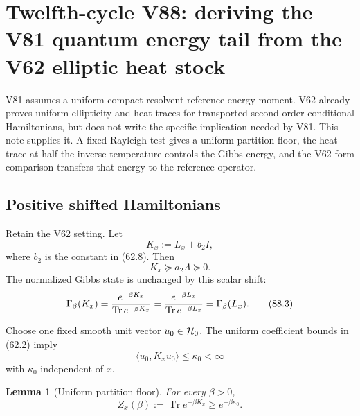 \documentclass[11pt]{article}
\newtheorem{lemma}[theorem]{Lemma}
\theoremstyle{remark}
\begin{document}

\section{Twelfth-cycle V88: deriving the V81 quantum energy tail from
the V62 elliptic heat stock}
\label{sec:v12v88}

V81 assumes a uniform compact-resolvent reference-energy moment.
V62 already proves uniform ellipticity and heat traces for transported
second-order conditional Hamiltonians, but does not write the
specific implication needed by V81.  This note supplies it.  A fixed
Rayleigh test gives a uniform partition floor, the heat trace at half
the inverse temperature controls the Gibbs energy, and the V62 form
comparison transfers that energy to the reference operator.

\subsection{Positive shifted Hamiltonians}

Retain the V62 setting.  Let
\[
                         K_x:=L_x+b_2I,                      \tag{88.1}
\]
where \(b_2\) is the constant in (62.8).  Then
\begin{equation}
                         K_x\succeq a_2\Lambda\succeq0.      \tag{88.2}
\end{equation}
The normalized Gibbs state is unchanged by this scalar shift:
\begin{equation}
 \Gamma_\beta(K_x)
 ={e^{-\beta K_x}\over\operatorname{Tr}e^{-\beta K_x}}
 =
 {e^{-\beta L_x}\over\operatorname{Tr}e^{-\beta L_x}}
 =\Gamma_\beta(L_x).                                       \tag{88.3}
\end{equation}

Choose one fixed smooth unit vector \(u_0\in{\cal H}_0\).
The uniform coefficient bounds in (62.2) imply
\begin{equation}
                         \langle u_0,K_xu_0\rangle
                         \leq\kappa_0<\infty                 \tag{88.4}
\end{equation}
with \(\kappa_0\) independent of \(x\).

\begin{lemma}[Uniform partition floor]
\label{lem:v12v88-floor}
For every \(\beta>0\),
\begin{equation}
 Z_x(\beta):=\operatorname{Tr}e^{-\beta K_x}
 \geq e^{-\beta\kappa_0}.                                  \tag{88.5}
\end{equation}
\end{lemma}
\end{document}

